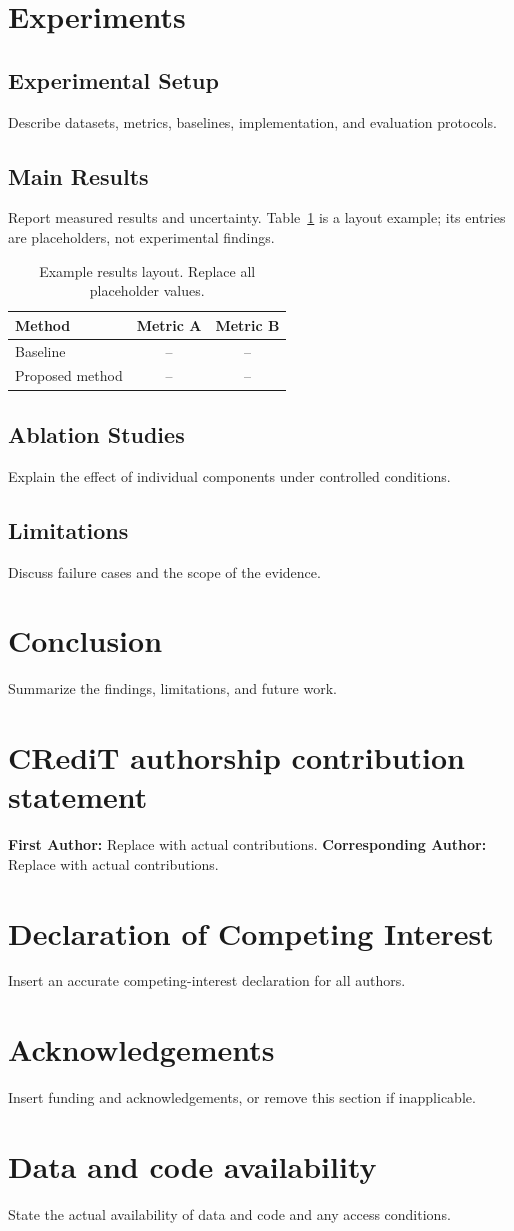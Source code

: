 \documentclass[review,number,sort&compress,nopreprintline]{elsarticle}
\begin{document}
\section{Experiments}
\subsection{Experimental Setup}
Describe datasets, metrics, baselines, implementation, and evaluation protocols.
\subsection{Main Results}
Report measured results and uncertainty. Table~\ref{tab:results} is a layout
example; its entries are placeholders, not experimental findings.
\begin{table}[t]
  \centering
  \caption{Example results layout. Replace all placeholder values.}
  \label{tab:results}
  \begin{tabular}{lcc}
    \toprule
    Method & Metric A & Metric B \\
    \midrule
    Baseline & -- & -- \\
    Proposed method & -- & -- \\
    \bottomrule
  \end{tabular}
\end{table}
\subsection{Ablation Studies}
Explain the effect of individual components under controlled conditions.
\subsection{Limitations}
Discuss failure cases and the scope of the evidence.

\section{Conclusion}
Summarize the findings, limitations, and future work.
\section*{CRediT authorship contribution statement}
\textbf{First Author:} Replace with actual contributions.
\textbf{Corresponding Author:} Replace with actual contributions.
\section*{Declaration of Competing Interest}
Insert an accurate competing-interest declaration for all authors.
\section*{Acknowledgements}
Insert funding and acknowledgements, or remove this section if inapplicable.
\section*{Data and code availability}
State the actual availability of data and code and any access conditions.


\end{document}
